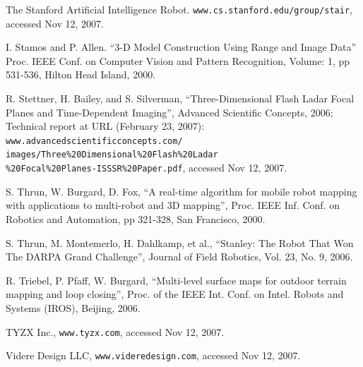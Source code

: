 \documentclass[twocolumn,oneside]{book}
\begin{document}
\begin{thebibliography}{99}

The Stanford Artificial Intelligence Robot.
\verb+www.cs.stanford.edu/group/stair+, accessed Nov 12, 2007.

I. Stamos and P. Allen.
``3-D Model Construction Using Range and Image Data''
Proc. IEEE Conf. on Computer Vision and Pattern Recognition, 
Volume: 1,  pp 531-536, Hilton Head Island, 2000. 

R. Stettner, H. Bailey, and S. Silverman,
``Three-Dimensional Flash Ladar Focal Planes and Time-Dependent Imaging'',
Advanced Scientific Concepts, 2006;
Technical report at URL (February 23, 2007):
\verb+www.advancedscientificconcepts.com/+\\
\verb+images/Three%20Dimensional%20Flash%20Ladar+\\
\verb+%20Focal%20Planes-ISSSR%20Paper.pdf+, accessed Nov 12, 2007.

S. Thrun, W. Burgard, D. Fox,
``A real-time algorithm for mobile robot mapping with applications to
multi-robot and 3D mapping'',  
Proc. IEEE Inf. Conf. on Robotics and Automation, pp 321-328, San Francisco, 2000.



S. Thrun, M. Montemerlo, H. Dahlkamp, et al.,
``Stanley: The Robot That Won The DARPA Grand Challenge'',
Journal of Field Robotics, Vol. 23, No. 9, 2006.

R. Triebel, P. Pfaff, W. Burgard,
``Multi-level surface maps for outdoor terrain mapping and loop closing'',
Proc. of the IEEE Int. Conf. on Intel. Robots and Systems (IROS), Beijing, 2006.


TYZX Inc.,
\verb+www.tyzx.com+, accessed Nov 12, 2007.

Videre Design LLC,
\verb+www.videredesign.com+, accessed Nov 12, 2007.


\end{thebibliography}
\end{document}
